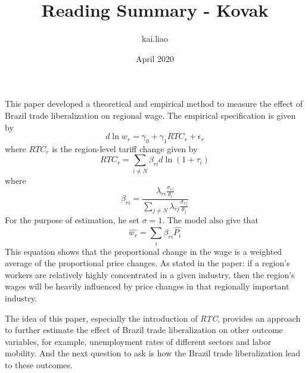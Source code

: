 \documentclass{article}
\title{Reading Summary - Kovak}
\author{kai.liao }
\date{April 2020}
\begin{document}
\maketitle

This paper developed a theoretical and empirical method to measure the effect of Brazil trade liberalization
on regional wage. The empirical specification is given by
\begin{equation}
    d\ln{w_r} = \gamma_0 + \gamma_1RTC_r +\epsilon_r
\end{equation}
where $RTC_r$ is the region-level tariff change given by
\begin{equation}
    RTC_r = \sum_{i \neq N}\beta_{ri}d\ln{(1+\tau_i)}
\end{equation}
where
\begin{equation}
    \beta_{ri} = \frac{\lambda_{ri}\frac{\sigma_{ri}}{\theta_i}}{\sum_{j\neq N}\lambda_{rj}\frac{\sigma_{rj}}{\theta_j}}
\end{equation}
For the purpose of estimation, he set $\sigma = 1$.
The model also give that
\begin{equation}
    \hat{w_r}=\sum_i \beta_{ri}\hat{P_i}
\end{equation}
This equation shows that the proportional change in the wage is a weighted average of the proportional price changes. As stated in the paper: if a region’s workers are relatively highly concentrated in a given industry, then the region’s wages will be heavily influenced by price changes in that regionally important industry.

The idea of this paper, especially the introduction of \textit{RTC}, provides an approach to further estimate the effect of Brazil trade liberalization on other outcome variables, for example, unemployment rates of different sectors and labor mobility. And the next question to ask is how the Brazil trade liberalization lead to these outcomes.
\end{document}
